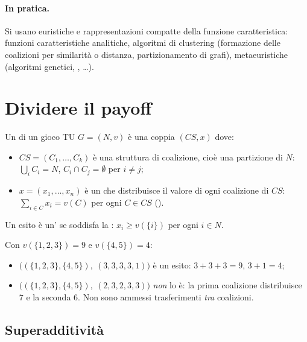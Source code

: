 \paragraph{In pratica.}
Si usano euristiche e rappresentazioni compatte della funzione caratteristica: funzioni
caratteristiche analitiche, algoritmi di clustering (formazione delle coalizioni per
similarità o distanza, partizionamento di grafi), metaeuristiche (algoritmi genetici,
, \ldots).

\section{Dividere il payoff}

\begin{definizione}
Un  di un gioco TU $G = (N,v)$ è una coppia $(CS, x)$ dove:
\begin{itemize}
  \item $CS = (C_1, \dots, C_k)$ è una struttura di coalizione, cioè una partizione di $N$:
        $\bigcup_i C_i = N$, $C_i \cap C_j = \emptyset$ per $i \ne j$;
  \item $x = (x_1,\dots,x_n)$ è un  che distribuisce il valore di ogni
        coalizione di $CS$: $\sum_{i \in C} x_i = v(C)$ per ogni $C \in CS$
        ().
\end{itemize}
Un esito è un' se soddisfa la :
$x_i \ge v(\{i\})$ per ogni $i \in N$.
\end{definizione}

\begin{esempio}[esiti]
Con $v(\{1,2,3\}) = 9$ e $v(\{4,5\}) = 4$:
\begin{itemize}
  \item $\bigl((\{1,2,3\},\{4,5\}),\ (3,3,3,3,1)\bigr)$ è un esito: $3+3+3 = 9$, $3+1 = 4$;
  \item $\bigl((\{1,2,3\},\{4,5\}),\ (2,3,2,3,3)\bigr)$ \emph{non} lo è: la prima
        coalizione distribuisce $7$ e la seconda $6$. Non sono ammessi trasferimenti
        \emph{tra} coalizioni.
\end{itemize}
\end{esempio}

\subsection{Superadditività}

